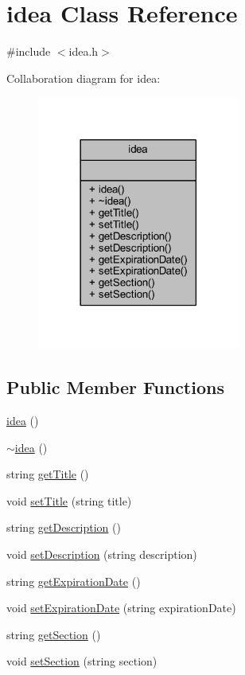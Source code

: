 \hypertarget{classidea}{}\section{idea Class Reference}
\label{classidea}


{\ttfamily \#include $<$idea.\+h$>$}



Collaboration diagram for idea\+:
\nopagebreak
\begin{figure}[H]
\begin{center}
\leavevmode
\includegraphics[width=189pt]{classidea__coll__graph}
\end{center}
\end{figure}
\subsection*{Public Member Functions}
\begin{DoxyCompactItemize}
\item 
\hyperlink{classidea_a1d3a67d3813015e9e75f1183ec82d854}{idea} ()
\item 
\hyperlink{classidea_a32ffac1287ee205afd22393502d45dcb}{$\sim$idea} ()
\item 
string \hyperlink{classidea_aa0d5775c2772b9df915f8afb71733db1}{get\+Title} ()
\item 
void \hyperlink{classidea_af8ed6afdce81c8cc6e670de6df9c5a29}{set\+Title} (string title)
\item 
string \hyperlink{classidea_ad6d700f2085c1f0c7fdb53d8392696d2}{get\+Description} ()
\item 
void \hyperlink{classidea_a1d802a70366e01b0b84b74a32e7b59b6}{set\+Description} (string description)
\item 
string \hyperlink{classidea_a1db648a0b1b7ca9261591602e81a5bcb}{get\+Expiration\+Date} ()
\item 
void \hyperlink{classidea_a32c343cccc7695d069c8429cf2cf88d5}{set\+Expiration\+Date} (string expiration\+Date)
\item 
string \hyperlink{classidea_adbb859a3de7fb7c62590741c8aa5835e}{get\+Section} ()
\item 
void \hyperlink{classidea_a6e79914f79f187ae29108eb9d164658d}{set\+Section} (string section)
\end{DoxyCompactItemize}


